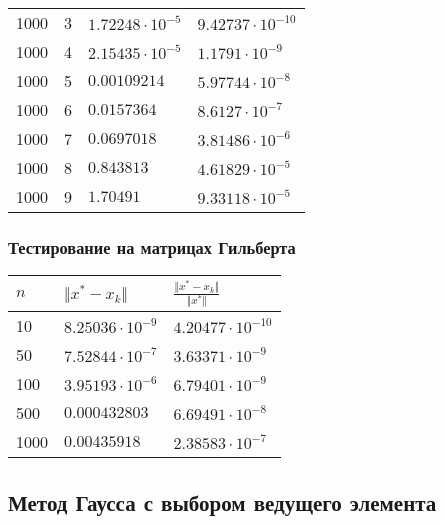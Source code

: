 \documentclass[english]{article}
\begin{document}
\begin{center}
\begin{longtable}{l|l|l|l}
1000 & 3 & \(1.72248\cdot 10^{-5} \)& \(9.42737\cdot 10^{-10}\) \\
1000 & 4 & \(2.15435\cdot 10^{-5} \)& \(1.1791\cdot 10^{-9}\) \\
1000 & 5 & \(0.00109214  \)& \(5.97744\cdot 10^{-8}\) \\
1000 & 6 & \(0.0157364   \)& \(8.6127\cdot 10^{-7}\) \\
1000 & 7 & \(0.0697018   \)& \(3.81486\cdot 10^{-6}\) \\
1000 & 8 & \(0.843813    \)& \(4.61829\cdot 10^{-5}\) \\
1000 & 9 & \(1.70491     \)& \(9.33118\cdot 10^{-5}\)
  \end{longtable}
\end{center}
\subsubsection{Тестирование на матрицах Гильберта}
\begin{center}
  \begin{longtable}{l|l|l}
    \(n\) & \(\Vert x^* - x_k \Vert\) & \(\frac{\Vert x^* - x_k \Vert}{\Vert x^* \Vert}\) \\
    \hline
    10 & \(8.25036\cdot 10^{-9}\) & \(4.20477\cdot 10^{-10}\) \\
    50 & \(7.52844\cdot 10^{-7}\) & \(3.63371\cdot 10^{-9}\) \\
    100 & \(3.95193\cdot 10^{-6}\) & \(6.79401\cdot 10^{-9}\) \\
    500 & \(0.000432803\) & \(6.69491\cdot 10^{-8}\) \\
    1000 & \(0.00435918 \) & \(2.38583\cdot 10^{-7}\) 
  \end{longtable}
\end{center}
\subsection{Метод Гаусса с выбором ведущего элемента}
\end{document}
